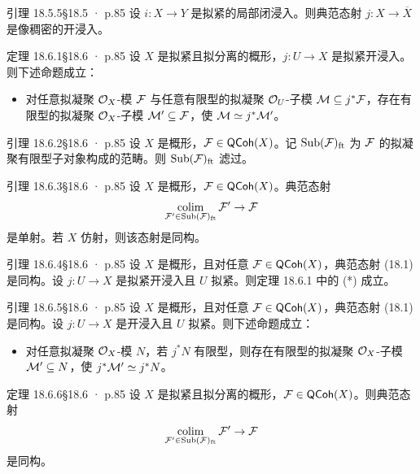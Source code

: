 \documentclass[UTF8,10pt,fontset=windows]{ctexart}
\newcommand{\colim}{\operatorname*{colim}}
\begin{document}
\begin{card}{引理 18.5.5}{§18.5 · p.85}
设 $i:X\to Y$ 是拟紧的局部闭浸入。则典范态射 $j:X\to\overline{X}$ 是像稠密的开浸入。
\end{card}
\begin{card}{定理 18.6.1}{§18.6 · p.85}
设 $X$ 是拟紧且拟分离的概形，$j:U\to X$ 是拟紧开浸入。则下述命题成立：
\begin{itemize}[leftmargin=1.5em,itemsep=0.15ex]
  \item[(*)] 对任意拟凝聚 $\mathcal{O}_X$-模 $\mathcal{F}$ 与任意有限型的拟凝聚 $\mathcal{O}_U$-子模 $\mathcal{M}\subseteq j^*\mathcal{F}$，存在有限型的拟凝聚 $\mathcal{O}_X$-子模 $\mathcal{M}'\subseteq\mathcal{F}$，使 $\mathcal{M}\simeq j^*\mathcal{M}'$。
\end{itemize}
\end{card}
\begin{card}{引理 18.6.2}{§18.6 · p.85}
设 $X$ 是概形，$\mathcal{F}\in\mathsf{QCoh}(X)$。记 $\mathrm{Sub}(\mathcal{F})_{\mathrm{ft}}$ 为 $\mathcal{F}$ 的拟凝聚有限型子对象构成的范畴。则 $\mathrm{Sub}(\mathcal{F})_{\mathrm{ft}}$ 滤过。
\end{card}
\begin{card}{引理 18.6.3}{§18.6 · p.85}
设 $X$ 是概形，$\mathcal{F}\in\mathsf{QCoh}(X)$。典范态射
\begin{equation}
\colim_{\cF'\in\mathrm{Sub}(\cF)_{\mathrm{ft}}}\cF'\to\cF
\end{equation}
是单射。若 $X$ 仿射，则该态射是同构。
\end{card}
\begin{card}{引理 18.6.4}{§18.6 · p.85}
设 $X$ 是概形，且对任意 $\mathcal{F}\in\mathsf{QCoh}(X)$，典范态射 (18.1) 是同构。设 $j:U\to X$ 是拟紧开浸入且 $U$ 拟紧。则定理 18.6.1 中的 (*) 成立。
\end{card}
\begin{card}{引理 18.6.5}{§18.6 · p.85}
设 $X$ 是概形，且对任意 $\mathcal{F}\in\mathsf{QCoh}(X)$，典范态射 (18.1) 是同构。设 $j:U\to X$ 是开浸入且 $U$ 拟紧。则下述命题成立：
\begin{itemize}[leftmargin=1.5em,itemsep=0.15ex]
  \item[(*)] 对任意拟凝聚 $\mathcal{O}_X$-模 $N$，若 $j^*N$ 有限型，则存在有限型的拟凝聚 $\mathcal{O}_X$-子模 $\mathcal{M}'\subseteq N$，使 $j^*\mathcal{M}'\simeq j^*N$。
\end{itemize}
\end{card}
\begin{card}{定理 18.6.6}{§18.6 · p.85}
设 $X$ 是拟紧且拟分离的概形，$\mathcal{F}\in\mathsf{QCoh}(X)$。则典范态射
\begin{equation}
\colim_{\cF'\in\mathrm{Sub}(\cF)_{\mathrm{ft}}}\cF'\to\cF
\end{equation}
是同构。
\end{card}
\end{document}
